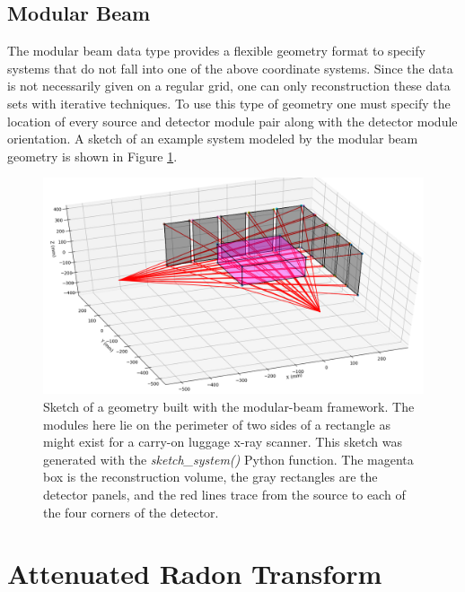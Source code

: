 \documentclass[11pt]{article}
\begin{document}
\subsection{Modular Beam}

The modular beam data type provides a flexible geometry format to specify systems that do not fall into one of the above coordinate systems.  Since the data is not necessarily given on a regular grid, one can only reconstruction these data sets with iterative techniques.  To use this type of geometry one must specify the location of every source and detector module pair along with the detector module orientation.  A sketch of an example system modeled by the modular beam geometry is shown in Figure \ref{fig:modularBeamSketch}.

\begin{figure}[h]
\begin{center}
\includegraphics[scale=0.5]{modularBeam}
\end{center}
\caption{Sketch of a geometry built with the modular-beam framework.  The modules here lie on the perimeter of two sides of a rectangle as might exist for a carry-on luggage x-ray scanner.  This sketch was generated with the \textit{sketch\_system()} Python function.  The  magenta box is the reconstruction volume, the gray rectangles are the detector panels, and the red lines trace from the source to each of the four corners of the detector.} \label{fig:modularBeamSketch}
\end{figure}

\section{Attenuated Radon Transform}
\end{document}
